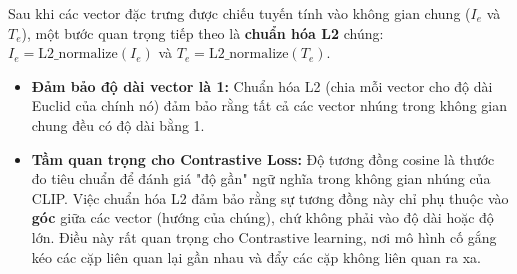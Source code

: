 \begin{enumerate}
    Sau khi các vector đặc trưng được chiếu tuyến tính vào không gian chung ($I_e$ và $T_e$), một bước quan trọng tiếp theo là \textbf{chuẩn hóa L2} chúng: $I_e = \text{L2\_normalize}(I_e)$ và $T_e = \text{L2\_normalize}(T_e)$.
    \begin{itemize}
        \item \textbf{Đảm bảo độ dài vector là 1:} Chuẩn hóa L2 (chia mỗi vector cho độ dài Euclid của chính nó) đảm bảo rằng tất cả các vector nhúng trong không gian chung đều có độ dài bằng 1.
        \item \textbf{Tầm quan trọng cho Contrastive Loss:} Độ tương đồng cosine là thước đo tiêu chuẩn để đánh giá "độ gần" ngữ nghĩa trong không gian nhúng của CLIP. Việc chuẩn hóa L2 đảm bảo rằng sự tương đồng này chỉ phụ thuộc vào \textbf{góc} giữa các vector (hướng của chúng), chứ không phải vào độ dài hoặc độ lớn. Điều này rất quan trọng cho Contrastive learning, nơi mô hình cố gắng kéo các cặp liên quan lại gần nhau và đẩy các cặp không liên quan ra xa.
    \end{itemize}


\end{enumerate}
